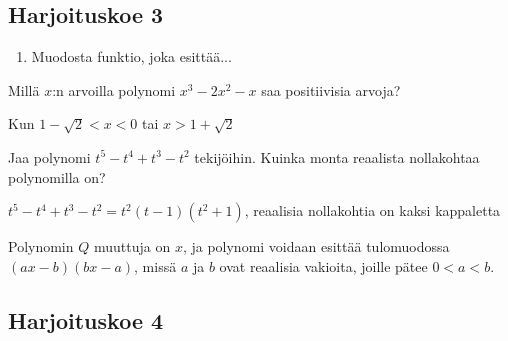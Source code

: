\subsection*{Harjoituskoe 3}


\begin{enumerate}
\item Muodosta funktio, joka esittää...
\end{enumerate}

\begin{tehtava}
Millä $x$:n arvoilla polynomi $x^3-2x^2-x$ saa positiivisia arvoja?
	\begin{vastaus}
	Kun $1-\sqrt{2}<x<0$ tai $x>1+\sqrt{2}$
	\end{vastaus}
\end{tehtava}

\begin{tehtava}
Jaa polynomi $t^5-t^4+t^3-t^2$ tekijöihin. Kuinka monta reaalista nollakohtaa polynomilla on?
	\begin{vastaus}
	$t^5-t^4+t^3-t^2=t^2(t-1)(t^2+1)$, reaalisia nollakohtia on kaksi kappaletta
	\end{vastaus}
\end{tehtava}

\begin{tehtava}
Polynomin $Q$ muuttuja on $x$, ja polynomi voidaan esittää tulomuodossa $(ax-b)(bx-a)$, missä $a$ ja $b$ ovat reaalisia vakioita, joille pätee $0<a<b$.
	\begin{alakohdat}
	\end{alakohdat}
		\begin{vastaus}
	\begin{alakohdat}
	\alakohta{$\frac{b^2-a^2}{ab}$}
	\alakohta{}
	\end{alakohdat}
		\end{vastaus}
\end{tehtava}
\newpage

\subsection*{Harjoituskoe 4}

